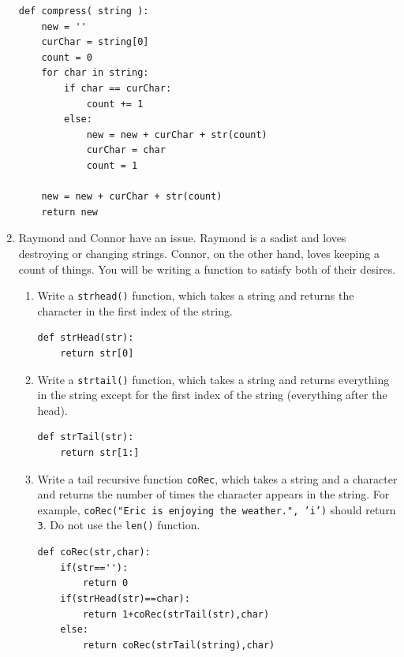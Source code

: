 \documentclass[11pt]{article}
\newenvironment{answer}{\large\lstset{basicstyle=\large}\color{white}}{}
\newenvironment{answer}{\large\lstset{basicstyle=\large}\color{red}}{}
\begin{document}
\begin{enumerate}
\begin{answer}
\begin{lstlisting}
def compress( string ):
    new = ''
    curChar = string[0]
    count = 0
    for char in string:
        if char == curChar:
            count += 1
        else:
            new = new + curChar + str(count)
            curChar = char
            count = 1 

    new = new + curChar + str(count)
    return new
\end{lstlisting}
\end{answer}

\newpage
\item
Raymond and Connor have an issue.
Raymond is a sadist and loves destroying or changing strings.
Connor, on the other hand, loves keeping a count of things.
You will be writing a function to satisfy both of their desires.
\begin{enumerate}
\item
Write a \texttt{strhead()} function, which takes a string and returns the character in the first index of the string.
\begin{answer}
\begin{lstlisting}
def strHead(str):
    return str[0]
\end{lstlisting}
\end{answer}
\item
Write a \texttt{strtail()} function, which takes a string and returns everything in the string except for the first index of the string (everything after the head).
\begin{answer}
\begin{lstlisting}
def strTail(str):
    return str[1:]
\end{lstlisting}
\end{answer}
\item
\label{tailrecursive}
Write a tail recursive function \texttt{coRec}, which takes a string and a character and returns the number of times the character appears in the string.
For example, \texttt{coRec("Eric is enjoying the weather.", 'i')} should return \texttt{3}.
Do not use the \texttt{len()} function.
\begin{answer}
\begin{lstlisting}
def coRec(str,char):
    if(str==''):
        return 0
    if(strHead(str)==char):
        return 1+coRec(strTail(str),char)
    else:
        return coRec(strTail(string),char)
\end{lstlisting}
\end{answer}


\end{enumerate}
\end{enumerate}
\end{document}
